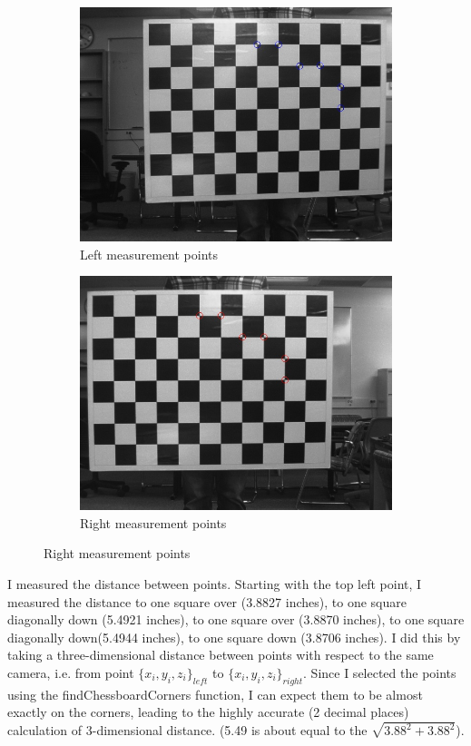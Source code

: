 \documentclass[12pt,a4paper,final]{article}
\begin{document}
\begin{figure}[H]
\centering
\begin{subfigure}{.5\textwidth}
  \centering
  \includegraphics[width=.9\linewidth]{measurementL}
  \caption{Left measurement points}
  \label{fig:sub1}
\end{subfigure}%
\begin{subfigure}{.5\textwidth}
  \centering
  \includegraphics[width=.9\linewidth]{measurementR}
  \caption{Right measurement points}
  \label{fig:sub2}
\end{subfigure}
\label{fig:test}
\end{figure}

I measured the distance between points. Starting with the top left point, I measured the distance to one square over (3.8827 inches), to one square diagonally down (5.4921 inches), to one square over (3.8870 inches), to one square diagonally down(5.4944 inches), to one square down (3.8706 inches). I did this by taking a three-dimensional distance between points with respect to the same camera, i.e. from point $\{x_i, y_i, z_i\}_{left}$ to $\{x_i, y_i, z_i\}_{right}$. Since I selected the points using the findChessboardCorners function, I can expect them to be almost exactly on the corners, leading to the highly accurate (2 decimal places) calculation of 3-dimensional distance. (5.49 is about equal to the $\sqrt{3.88^2 + 3.88^2}$).
\end{document}
